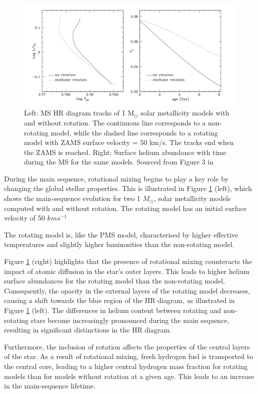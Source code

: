 \begin{figure}[h]
    \includegraphics[width=\textwidth]{Figures/intro_figures/MS_effect.png}
    \caption{Left: MS HR diagram tracks of 1 M$_{\odot}$ solar metallicity models with and without rotation. The continuous line corresponds to a non-rotating model, while the dashed line corresponds to a rotating model with ZAMS surface velocity = 50 km/s. The tracks end when the ZAMS is reached. Right: Surface helium abundance with time during the MS for the same models. Sourced from Figure 3 in \citet{eggenberger_rotation_2013}}
    \label{fig:ms_effect}
\end{figure}

During the main sequence, rotational mixing begins to play a key role by changing the global stellar
properties. 
This is illustrated in Figure \ref{fig:ms_effect} (left), which shows the main-sequence evolution for two 1 $M_{\odot}$, solar metallicity models computed with and without rotation.
The rotating model has an initial surface velocity of 50 $km s^{-1}$

The rotating model is, like the PMS model, characterised by higher effective temperatures and slightly higher luminosities than the non-rotating model.

Figure \ref{fig:ms_effect} (right) highlights that the presence of rotational mixing counteracts the impact of atomic diffusion in the star's outer layers. 
This leads to higher helium surface abundances for the rotating model than the non-rotating model.
Consequently, the opacity in the external layers of the rotating model decreases, causing a shift towards the blue region of the HR diagram, as illustrated in Figure \ref{fig:ms_effect} (left). 
The differences in helium content between rotating and non-rotating stars become increasingly pronounced during the main sequence, resulting in significant distinctions in the HR diagram.

Furthermore, the inclusion of rotation affects the properties of the central layers of the star. As a result of rotational mixing, fresh hydrogen fuel is transported to the central core, leading to a higher central hydrogen mass fraction for rotating models than for models without rotation at a given age. This leads to an increase in the main-sequence lifetime.

